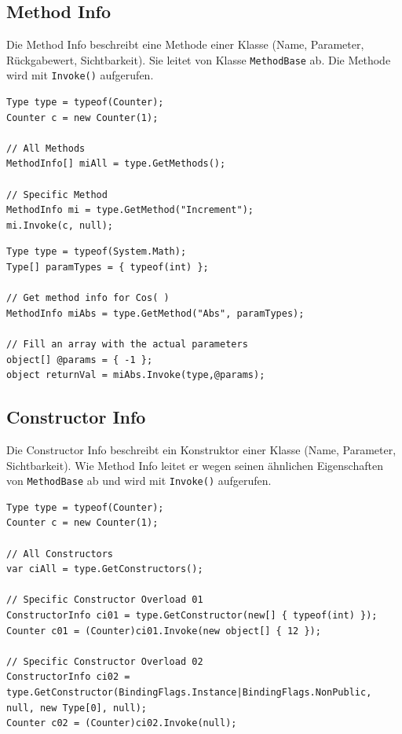 \documentclass[
a4paper,
oneside,
10pt,
fleqn,
headsepline,
toc=listofnumbered, 
bibliography=totocnumbered]{scrartcl}
\begin{document}
\subsection{Method Info}
Die Method Info beschreibt eine Methode einer Klasse (Name, Parameter, Rückgabewert, Sichtbarkeit). Sie leitet von Klasse \lstinline|MethodBase| ab. Die Methode wird mit \lstinline|Invoke()| aufgerufen.
\begin{lstlisting}[caption=Reflection: Method Info]
Type type = typeof(Counter);
Counter c = new Counter(1);

// All Methods
MethodInfo[] miAll = type.GetMethods();

// Specific Method
MethodInfo mi = type.GetMethod("Increment");
mi.Invoke(c, null);
\end{lstlisting}

\begin{lstlisting}[caption=Reflection: Method Info mit Parametern]
Type type = typeof(System.Math);
Type[] paramTypes = { typeof(int) };

// Get method info for Cos( )
MethodInfo miAbs = type.GetMethod("Abs", paramTypes);

// Fill an array with the actual parameters
object[] @params = { -1 };
object returnVal = miAbs.Invoke(type,@params);
\end{lstlisting}

\subsection{Constructor Info}
Die Constructor Info beschreibt ein Konstruktor einer Klasse (Name, Parameter, Sichtbarkeit). Wie Method Info leitet er wegen seinen ähnlichen Eigenschaften von \lstinline|MethodBase| ab und wird  mit \lstinline|Invoke()| aufgerufen.
\begin{lstlisting}[caption=Reflection: Constructor Info]
Type type = typeof(Counter);
Counter c = new Counter(1);

// All Constructors
var ciAll = type.GetConstructors();

// Specific Constructor Overload 01
ConstructorInfo ci01 = type.GetConstructor(new[] { typeof(int) });
Counter c01 = (Counter)ci01.Invoke(new object[] { 12 });

// Specific Constructor Overload 02
ConstructorInfo ci02 = type.GetConstructor(BindingFlags.Instance|BindingFlags.NonPublic, null, new Type[0], null);
Counter c02 = (Counter)ci02.Invoke(null);
\end{lstlisting}
\end{document}
